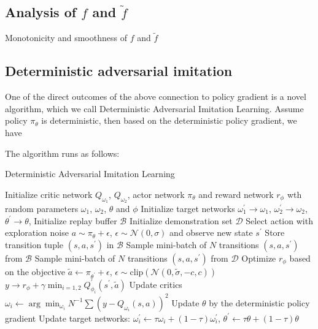 \subsection{Analysis of $f$ and $\tilde{f}$}
Monotonicity and smoothness of $f$ and $\tilde{f}$


\subsection{Deterministic adversarial imitation}
One of the direct outcomes of the above connection to policy gradient is a novel algorithm, which we call Deterministic Adversarial Imitation Learning. 
Assume policy $\pi_{\theta}$ is deterministic, then based on the deterministic policy gradient, we have

The algorithm runs as follows:

\begin{algorithm}
\caption{Deterministic Adversarial Imitation Learning}
\begin{algorithmic}[1] %
\STATE Initialize critic network $Q_{\omega_1}$, $Q_{\omega_2}$, actor network $\pi_{\theta}$ and reward network $r_{\phi}$ wth random parameters $\omega_1$, $\omega_2$, $\theta$ and $\phi$
\STATE Initialize target networks $\omega_1^\prime\rightarrow\omega_1$, $\omega_2^\prime\rightarrow\omega_2$, $\theta^\prime\rightarrow\theta$,
\STATE Initialize replay buffer $\mathcal{B}$
\STATE Initialize demonstration set $\mathcal{D}$
\STATE Select action with exploration noise $a\sim\pi_{\theta} + \epsilon$, $\epsilon\sim \mathcal{N}(0, \sigma)$ and observe new state $s^\prime$
\STATE Store transition tuple $(s, a, s^\prime)$ in $\mathcal{B}$
\STATE Sample mini-batch of $N$ transitions $(s, a, s^\prime)$ from $\mathcal{B}$
\STATE Sample mini-batch of $N$ transitions $(s, a, s^\prime)$ from $\mathcal{D}$
\STATE Optimize $r_{\phi}$ based on the objective
\ENDIF
\STATE $\tilde{a} \leftarrow \pi_{\theta^\prime}+\epsilon$, $\epsilon\sim \text{clip}(\mathcal{N}(0, \tilde{\sigma}, -c, c))$
\STATE $y\rightarrow r_{\phi}+\gamma \min_{i=1, 2}Q_{\phi_i}^\prime(s^\prime, \tilde{a})$
\STATE Update critics $\omega_i\leftarrow \arg\min_{\omega_i} N^{-1}\sum(y - Q_{\omega_i}(s, a))^2$
\STATE Update $\theta$ by the deterministic policy gradient
\STATE Update target networks: $\omega_i^\prime\leftarrow \tau \omega_i + (1-\tau)\omega_i^\prime$, $\theta^\prime \leftarrow \tau \theta + (1-\tau)\theta $
\ENDIF
\ENDFOR
\end{algorithmic}
\end{algorithm}
